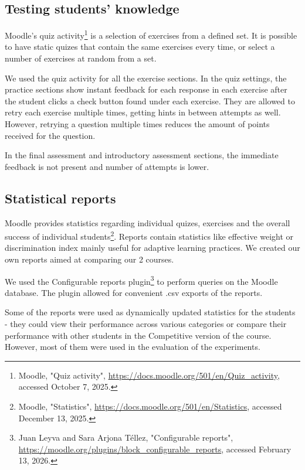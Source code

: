 

\subsection{Testing students' knowledge} \label{testing}
Moodle's quiz activity\footnote{Moodle, "Quiz activity", \url{https://docs.moodle.org/501/en/Quiz_activity}, accessed October 7, 2025.} is a selection of exercises from a defined set. It is possible to have static quizes that contain the same exercises every time, or select a number of exercises at random from a set.

We used the quiz activity for all the exercise sections. In the quiz settings, the practice sections show instant feedback for each response in each exercise after the student clicks a check button found under each exercise. They are allowed to retry each exercise multiple times, getting hints in between attempts as well. However, retrying a question multiple times reduces the amount of points received for the question.

In the final assessment and introductory assessment sections, the immediate feedback is not present and number of attempts is lower.


\subsection{Statistical reports} \label{statistics}
Moodle provides statistics regarding individual quizes, exercises and the overall success of individual students\footnote{Moodle, "Statistics", \url{https://docs.moodle.org/501/en/Statistics}, accessed December 13, 2025.}. Reports contain statistics like effective weight or
discrimination index mainly useful for adaptive learning practices. We created our own reports aimed at comparing our 2 courses. 

We used the Configurable reports plugin\footnote{Juan Leyva and Sara Arjona Téllez, "Configurable reports", \url{https://moodle.org/plugins/block_configurable_reports}, accessed February 13, 2026.} to perform queries on the Moodle database. The plugin allowed for convenient .csv exports of the reports. 

Some of the reports were used as dynamically updated statistics for the students - they could view their performance across various categories or compare their performance with other students in the Competitive version of the course. However, most of them were used in the evaluation of the experiments. 

